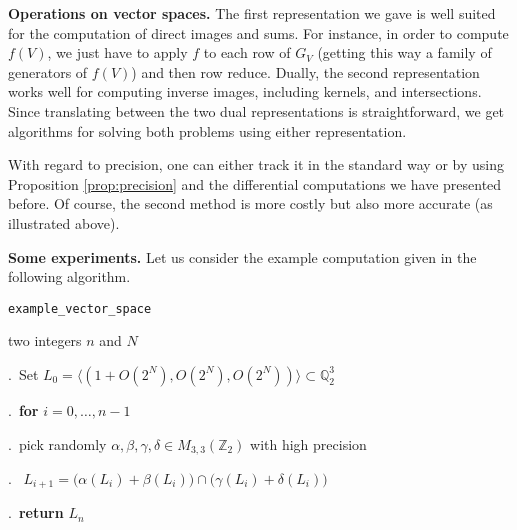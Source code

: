 \documentclass{sig-alternate}
\newcommand{\Z}{\mathbb Z}
\newcommand{\Q}{\mathbb Q}
\begin{document}
\smallskip

\noindent
{\bf Operations on vector spaces.}
The first representation we gave is well suited for the computation
of direct images and sums. For instance, in order to compute $f(V)$, 
we just have to apply $f$ to each row of $G_V$ (getting this way a
family of generators of $f(V)$) and then row reduce. Dually, the
second representation works well for computing inverse images, including 
kernels, and intersections. Since translating between the two dual
representations is straightforward, we get algorithms for solving both
problems using either representation.

With regard to precision, one can either track it in the standard way or 
by using Proposition \ref{prop:precision} and the differential 
computations we have presented before. Of course, the second method 
is more costly but also more accurate (as illustrated above).

\smallskip

\noindent
{\bf Some experiments.}
Let us consider the example computation given in the following
algorithm.

\noindent\hrulefill

 {\tt example\_vector\_space}

 two integers $n$ and $N$

\smallskip

.\ Set $L_0 = \langle (1 + O(2^N),  O(2^N), O(2^N)) \rangle
\subset \Q_2^3$

.\ {\bf for} $i=0,\dots,n-1$

.\ \hspace{0.3cm}pick randomly $\alpha, \beta, \gamma, \delta
\in M_{3,3}(\Z_2)$ with high precision

.\ \hspace{0.3cm}{\bf compute} $L_{i+1} = 
\big(\alpha(L_i) + \beta(L_i)\big) \cap \big(\gamma(L_i) + \delta(L_i)\big)$

.\ {\bf return} $L_n$

\vspace{-1ex}\noindent\hrulefill

\medskip
\end{document}
